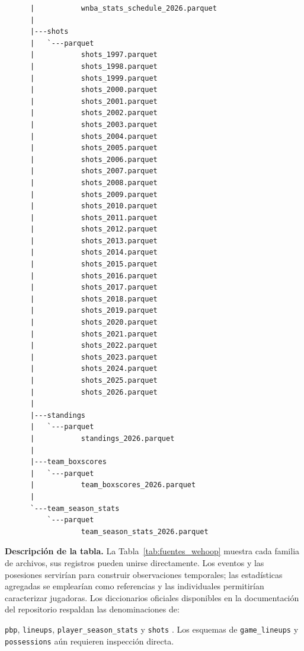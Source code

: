 \begin{lstlisting}
      |           wnba_stats_schedule_2026.parquet
      |
      |---shots
      |   `---parquet
      |           shots_1997.parquet
      |           shots_1998.parquet
      |           shots_1999.parquet
      |           shots_2000.parquet
      |           shots_2001.parquet
      |           shots_2002.parquet
      |           shots_2003.parquet
      |           shots_2004.parquet
      |           shots_2005.parquet
      |           shots_2006.parquet
      |           shots_2007.parquet
      |           shots_2008.parquet
      |           shots_2009.parquet
      |           shots_2010.parquet
      |           shots_2011.parquet
      |           shots_2012.parquet
      |           shots_2013.parquet
      |           shots_2014.parquet
      |           shots_2015.parquet
      |           shots_2016.parquet
      |           shots_2017.parquet
      |           shots_2018.parquet
      |           shots_2019.parquet
      |           shots_2020.parquet
      |           shots_2021.parquet
      |           shots_2022.parquet
      |           shots_2023.parquet
      |           shots_2024.parquet
      |           shots_2025.parquet
      |           shots_2026.parquet
      |
      |---standings
      |   `---parquet
      |           standings_2026.parquet
      |
      |---team_boxscores
      |   `---parquet
      |           team_boxscores_2026.parquet
      |
      `---team_season_stats
          `---parquet
                  team_season_stats_2026.parquet
\end{lstlisting}
\endgroup
\noindent\textbf{Descripción de la tabla.}
La Tabla~\ref{tab:fuentes_wehoop} muestra cada familia de archivos, sus registros pueden unirse directamente. Los eventos y las posesiones servirían para construir observaciones temporales; las estadísticas agregadas se emplearían como referencias y las individuales permitirían caracterizar jugadoras. Los diccionarios oficiales disponibles en la documentación del repositorio respaldan las denominaciones de:

\texttt{pbp}, \texttt{lineups}, \texttt{player\_season\_stats} y \texttt{shots} \cite{wehoopPbp,wehoopLineups,wehoopPlayerSeason,wehoopShots}. Los esquemas de \texttt{game\_lineups} y \texttt{possessions} aún requieren inspección directa.